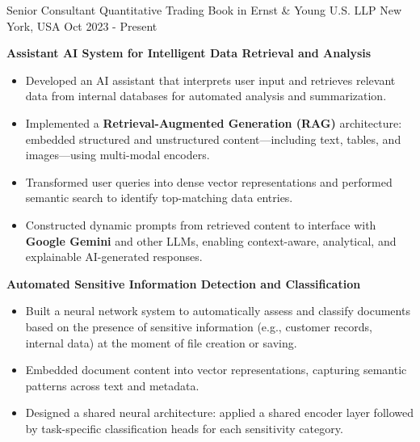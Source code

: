 

\begin{cventries}

\cventry
{Senior Consultant} %
{Quantitative Trading Book in Ernst \& Young U.S. LLP} %
{New York, USA} %
{Oct 2023 - Present} %
{
  \begin{cvitems}
    \item \textbf{Assistant AI System for Intelligent Data Retrieval and Analysis}
    \begin{itemize}
      \item Developed an AI assistant that interprets user input and retrieves relevant data from internal databases for automated analysis and summarization.
      \item Implemented a \textbf{Retrieval-Augmented Generation (RAG)} architecture: embedded structured and unstructured content—including text, tables, and images—using multi-modal encoders.
      \item Transformed user queries into dense vector representations and performed semantic search to identify top-matching data entries.
      \item Constructed dynamic prompts from retrieved content to interface with \textbf{Google Gemini} and other LLMs, enabling context-aware, analytical, and explainable AI-generated responses.
    \end{itemize}
    \item \textbf{Automated Sensitive Information Detection and Classification}
    \begin{itemize}
      \item Built a neural network system to automatically assess and classify documents based on the presence of sensitive information (e.g., customer records, internal data) at the moment of file creation or saving.
      \item Embedded document content into vector representations, capturing semantic patterns across text and metadata.
      \item Designed a shared neural architecture: applied a shared encoder layer followed by task-specific classification heads for each sensitivity category.

\end{itemize}
\end{cvitems}}
\end{cventries}
